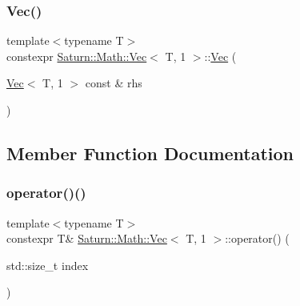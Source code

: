 \mbox{\label{class_saturn_1_1_math_1_1_vec_3_01_t_00_011_01_4_ac6aaeea7904fc3177bb01601b0393592}} 
\subsubsection{\texorpdfstring{Vec()}{Vec()}\hspace{0.1cm}{\footnotesize\ttfamily [3/3]}}
{\footnotesize\ttfamily template$<$typename T$>$ \\
constexpr \mbox{\hyperlink{class_saturn_1_1_math_1_1_vec}{Saturn\+::\+Math\+::\+Vec}}$<$ T, 1 $>$\+::\mbox{\hyperlink{class_saturn_1_1_math_1_1_vec}{Vec}} (\begin{DoxyParamCaption}\item[{\mbox{\hyperlink{class_saturn_1_1_math_1_1_vec}{Vec}}$<$ T, 1 $>$ const \&}]{rhs }\end{DoxyParamCaption})\hspace{0.3cm}{\ttfamily [inline]}}



\subsection{Member Function Documentation}
\mbox{\label{class_saturn_1_1_math_1_1_vec_3_01_t_00_011_01_4_a4e8afbdf70badbf72df737e618888883}} 
\subsubsection{\texorpdfstring{operator()()}{operator()()}\hspace{0.1cm}{\footnotesize\ttfamily [1/2]}}
{\footnotesize\ttfamily template$<$typename T$>$ \\
constexpr T\& \mbox{\hyperlink{class_saturn_1_1_math_1_1_vec}{Saturn\+::\+Math\+::\+Vec}}$<$ T, 1 $>$\+::operator() (\begin{DoxyParamCaption}\item[{std\+::size\+\_\+t}]{index }\end{DoxyParamCaption})\hspace{0.3cm}{\ttfamily [inline]}}

